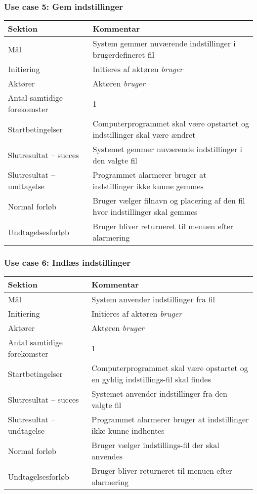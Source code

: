 \documentclass[kravspec.tex]{subfiles}
\begin{document}
	\subsubsection{Use case 5: Gem indstillinger}
	\begin{tabular}{|l|p{7.7cm}|}
		\hline \textbf{Sektion} 	& \textbf{Kommentar} \\ 
		\hline Mål  & System gemmer nuværende indstillinger i brugerdefineret fil \\ 
		\hline Initiering  & Initieres af aktøren \textit{bruger} \\ 
		\hline Aktører & Aktøren \textit{bruger} \\ 
		\hline Antal samtidige forekomster & 1 \\ 
		\hline Startbetingelser & Computerprogrammet skal være opstartet og indstillinger skal være ændret  \\ 
		\hline Slutresultat – succes & Systemet gemmer nuværende indstillinger i den valgte fil \\ 
		\hline Slutresultat – undtagelse & Programmet alarmerer bruger at indstillinger ikke kunne gemmes \\ 
		\hline Normal forløb & Bruger vælger filnavn og placering af den fil hvor indstillinger skal gemmes \\ 
		\hline Undtagelsesforløb & Bruger bliver returneret til menuen efter alarmering \\ 
		\hline 
	\end{tabular}
	
	\subsubsection{Use case 6: Indlæs indstillinger}
	\begin{tabular}{|l|p{7.7cm}|}
		\hline \textbf{Sektion} 	& \textbf{Kommentar} \\ 
		\hline Mål  & System anvender indstillinger fra fil \\ 
		\hline Initiering  & Initieres af aktøren \textit{bruger} \\ 
		\hline Aktører & Aktøren \textit{bruger} \\ 
		\hline Antal samtidige forekomster & 1 \\ 
		\hline Startbetingelser & Computerprogrammet skal være opstartet og en gyldig indstillings-fil skal findes  \\ 
		\hline Slutresultat – succes & Systemet anvender indstillinger fra den valgte fil \\ 
		\hline Slutresultat – undtagelse & Programmet alarmerer bruger at indstillinger ikke kunne indhentes \\ 
		\hline Normal forløb & Bruger vælger indstillings-fil der skal anvendes \\ 
		\hline Undtagelsesforløb & Bruger bliver returneret til menuen efter alarmering \\ 
		\hline 
	\end{tabular}
	
\end{document}
